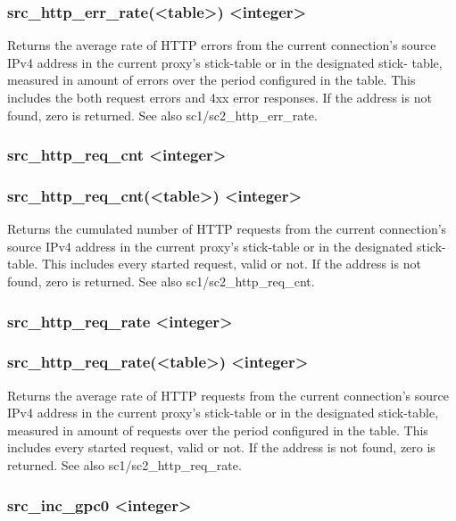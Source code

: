 \subsubsection{src\_http\_err\_rate(<table>) <integer>}
  Returns the average rate of HTTP errors from the current connection's source
  IPv4 address in the current proxy's stick-table or in the designated stick-
  table, measured in amount of errors over the period configured in the table.
  This includes the both request errors and 4xx error responses. If the address
  is not found, zero is returned. See also sc1/sc2\_http\_err\_rate.

\subsubsection[src\_http\_req\_cnt]{src\_http\_req\_cnt <integer>}
\subsubsection*{src\_http\_req\_cnt(<table>) <integer>}
  Returns the cumulated number of HTTP requests from the current connection's
  source IPv4 address in the current proxy's stick-table or in the designated
  stick-table. This includes every started request, valid or not. If the
  address is not found, zero is returned. See also sc1/sc2\_http\_req\_cnt.

\subsubsection[src\_http\_req\_rate]{src\_http\_req\_rate <integer>}
\subsubsection*{src\_http\_req\_rate(<table>) <integer>}
  Returns the average rate of HTTP requests from the current connection's
  source IPv4 address in the current proxy's stick-table or in the designated
  stick-table, measured in amount of requests over the period configured in the
  table. This includes every started request, valid or not. If the address is
  not found, zero is returned. See also sc1/sc2\_http\_req\_rate.

\subsubsection[src\_inc\_gpc0]{src\_inc\_gpc0 <integer>}
